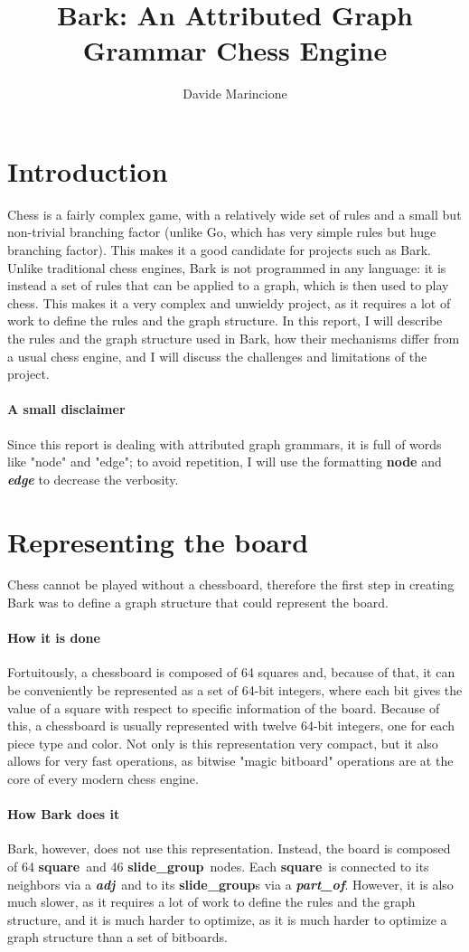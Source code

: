 \documentclass[twocolumn, a4paper]{scrartcl}
\title{Bark: An Attributed Graph Grammar Chess Engine}
\author{Davide Marincione}
\newcommand{\noderepr}[1]{\textsf{\textbf{#1}}}
\newcommand{\edgerepr}[1]{\textit{\textbf{#1}}}
\newcommand{\squarenode}{\noderepr{square}}
\newcommand{\slidegroupnode}{\noderepr{slide\_group}}
\newcommand{\adj}{\edgerepr{adj}}
\newcommand{\partof}{\edgerepr{part\_of}}
\begin{document}
    \maketitle
    \section{Introduction}
    Chess is a fairly complex game, with a relatively wide set of rules and a small but non-trivial branching factor (unlike Go, which has very simple rules but huge branching factor). This makes it a good candidate for projects such as Bark. Unlike traditional chess engines, Bark is not programmed in any language: it is instead a set of rules that can be applied to a graph, which is then used to play chess. This makes it a very complex and unwieldy project, as it requires a lot of work to define the rules and the graph structure. In this report, I will describe the rules and the graph structure used in Bark, how their mechanisms differ from a usual chess engine, and I will discuss the challenges and limitations of the project.

    \paragraph{A small disclaimer} Since this report is dealing with attributed graph grammars, it is full of words like "node" and "edge"; to avoid repetition, I will use the formatting \noderepr{node} and \edgerepr{edge} to decrease the verbosity.

    \section{Representing the board}
    Chess cannot be played without a chessboard, therefore the first step in creating Bark was to define a graph structure that could represent the board.
    \paragraph{How it is done} Fortuitously, a chessboard is composed of 64 squares and, because of that, it can be conveniently be represented as a set of 64-bit integers, where each bit gives the value of a square with respect to specific information of the board. Because of this, a chessboard is usually represented with twelve 64-bit integers, one for each piece type and color. Not only is this representation very compact, but it also allows for very fast operations, as bitwise "magic bitboard" operations are at the core of every modern chess engine.
    \paragraph{How Bark does it} Bark, however, does not use this representation. Instead, the board is composed of 64 \squarenode\ and 46 \slidegroupnode\  nodes. Each \squarenode\ is connected to its neighbors via a \adj\ and to its \slidegroupnode s via a \partof. However, it is also much slower, as it requires a lot of work to define the rules and the graph structure, and it is much harder to optimize, as it is much harder to optimize a graph structure than a set of bitboards.
\end{document}
